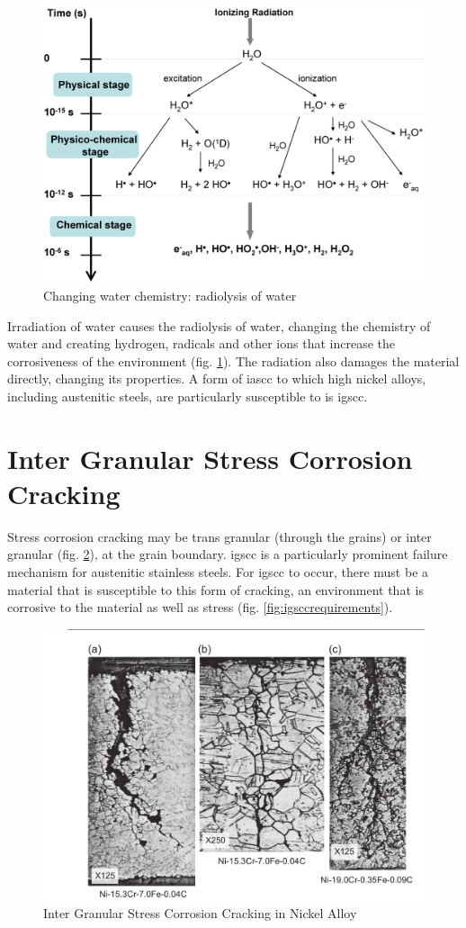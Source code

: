 \begin{figure}[h]
  \begin{center}
    \includegraphics[width=.5\linewidth]{chapters/austenitic_steels_in_nuclear/images/water_radiolysis.png}
    \caption{Changing water chemistry: radiolysis of water\cite{waterradiolysis}}
    \label{fig:radiolysisofwater}
  \end{center}
\end{figure}

Irradiation of water causes the radiolysis of water, changing the chemistry of water and creating hydrogen, radicals and other ions that increase the corrosiveness of the environment (fig. \ref{fig:radiolysisofwater}).  The radiation also damages the material directly, changing its properties.  A form of \acrshort{iascc} to which high nickel alloys, including austenitic steels, are particularly susceptible to is \acrlong{igscc}.


\FloatBarrier

\section[IGSCC]{Inter Granular Stress Corrosion Cracking}

Stress corrosion cracking may be trans granular (through the grains) or inter granular (fig. \ref{fig:igsccni}), at the grain boundary.  \acrshort{igscc} is a particularly prominent failure mechanism for austenitic stainless steels.  For \acrshort{igscc} to occur, there must be a material that is susceptible to this form of cracking, an environment that is corrosive to the material as well as stress (fig. \ref{fig:igsccrequirements}).  

\begin{figure}[h]
  \begin{center}
    \includegraphics[width=.45\linewidth]{chapters/austenitic_steels_in_nuclear/images/igscc_nickel_alloy600.png}
    \caption{Inter Granular Stress Corrosion Cracking in Nickel Alloy\cite{staehlecoriou}}
    \label{fig:igsccni}
  \end{center}
\end{figure}


